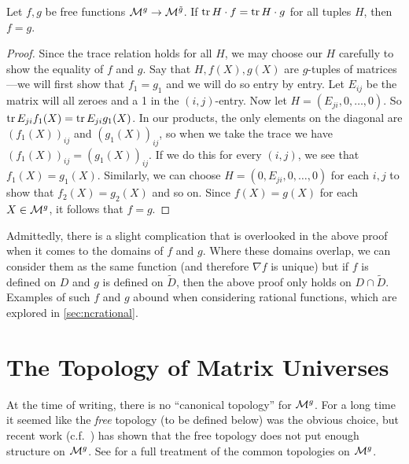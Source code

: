 \begin{theorem}%
\label{thm:trdual}
Let \(f,g\) be free functions \(\mathcal{M}^{g} \to \mathcal{M}^{\tilde{g}} \). If
\(\operatorname{tr} H \cdot f = \operatorname{tr} H \cdot g\) for all tuples \(H\), then \(f=g\).
\end{theorem}

\begin{proof}
  Since the trace relation holds for all $H$, we may choose our $H$ carefully to
  show the equality of $f$ and $g$. Say that $H,f(X),g(X)$ are $g$-tuples of
  matrices---we will first show that $f_1=g_1$ and we will do so entry by entry.
  Let $E_{ij}$ be the matrix will all zeroes and a 1 in the $(i,j)$-entry.  Now
  let $H= (E_{ji},0, \dots ,0)$. So $\operatorname{tr} E_{ji}f_1(X) = \operatorname{tr} E_{ji}g_1(X)$.
  In our products, the only elements on the diagonal are $(f_1(X))_{ij}$ and
  $(g_1(X))_{ij}$, so when we take the trace we have $(f_1(X))_{ij} =(g_1(X))_{ij}$. If we
  do this for every $(i,j)$, we see that $f_1(X)=g_1(X)$. Similarly, we can choose
  \(H = ( 0, E_{ji},0, \dots, 0)\) for each \(i,j\) to show that \(f_2(X)=g_2(X)\) and
  so on. Since \(f(X)=g(X)\) for each \(X \in \mathcal{M}^{g} \), it follows that \(f=g\).
\end{proof}

Admittedly, there is a slight complication that is overlooked in the above proof
when it comes to the domains of \(f\) and \(g\). Where these domains overlap, we
can consider them as the same function (and therefore \(\nabla f \) is unique)
but if \(f\) is defined on \(D\) and \(g\) is defined on \(\tilde{D}\), then the
above proof only holds on \(D \cap \tilde{D}\). Examples of such \(f\) and \(g\)
abound when considering rational functions, which are explored in
\cref{sec:ncrational}.

\section{The Topology of Matrix Universes }%
\label{sec:TopManUniv}

At the time of writing, there is no ``canonical topology'' for \(\mathcal{M}^g\). For a
long time it seemed like the \emph{free} topology (to be defined below) was the
obvious choice, but recent work (c.f.\ \cite{pascoeentire2019}) has shown that the free
topology does not put enough structure on \(\mathcal{M}^g\). See \cite{aglerAspects2016}
for a full treatment of the common topologies on \(\mathcal{M}^g\).


